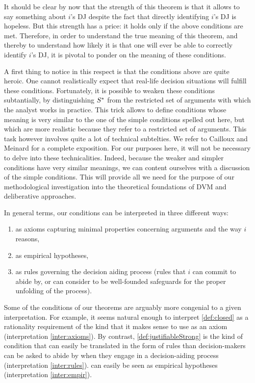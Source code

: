 \documentclass[version=3.21, pagesize, twoside=off, bibliography=totoc, DIV=calc, fontsize=12pt, a4paper, french, english]{scrartcl}
\begin{document}
It should be clear by now that the strength of this theorem is that it allows to say something about $i$'s \ac{DJ} despite the fact that directly identifying $i$'s \ac{DJ} is hopeless. But this strength has a price: it holds only if the above conditions are met. Therefore, in order to understand the true meaning of this theorem, and thereby to understand how likely it is that one will ever be able to correctly identify $i$'s \ac{DJ}, it is pivotal to ponder on the meaning of these conditions.

A first thing to notice in this respect is that the conditions above are quite heroic. One cannot realistically expect that real-life decision situations will fulfill these conditions. Fortunately, it is possible to weaken these conditions subtantially, by distinguishing $S^*$ from the restricted set of arguments with which the analyst works in practice. This trick allows to define conditions whose meaning is very similar to the one of the simple conditions spelled out here, but which are more realistic because they refer to a restricted set of arguments. This task however involves quite a lot of technical subtelties. We refer to Cailloux and Meinard for a complete exposition. For our purposes here, it will not be necessary to delve into these technicalities. Indeed, because the weaker and simpler conditions have very similar meanings, we can content ourselves with a discussion of the simple conditions. This will provide all we need for the purpose of our methodological investigation into the theoretical foundations of DVM and deliberative approaches.

In general terms, our conditions can be interpreted in three different ways:
\begin{enumerate}[label=({\roman*})]%
	\item \label{inter:axioms} as axioms capturing minimal properties concerning arguments and the way $i$ reasons, 
	\item \label{inter:empir} as empirical hypotheses,
	\item \label{inter:rules} as rules governing the decision aiding process (rules that $i$ can commit to abide by, or can consider to be well-founded safeguards for the proper unfolding of the process).
\end{enumerate}

Some of the conditions of our theorems are arguably more congenial to a given interpretation. For example, it seems natural enough to interpret \cref{def:closed} as a rationality requirement of the kind that it makes sense to use as an axiom (interpretation \ref{inter:axioms}). 
By contrast, \cref{def:justifiableStrong} is the kind of condition that can easily be translated in the form of rules than decision-makers can be asked to abide by when they engage in a decision-aiding process (interpretation \ref{inter:rules}). 
 can easily be seen as empirical hypotheses (interpretation \ref{inter:empir}).
\end{document}
